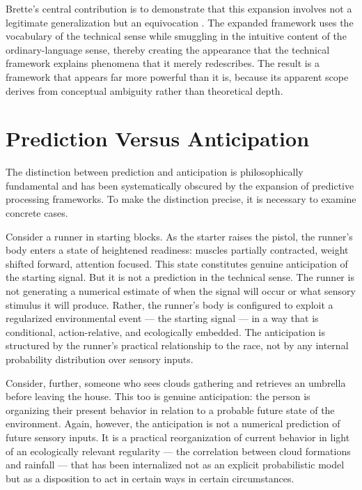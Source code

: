 \documentclass[12pt,a4paper]{report}
\theoremstyle{flyxion}
\begin{document}
Brette's central contribution is to demonstrate that this expansion involves not a legitimate generalization but an equivocation \cite{brettepredictive}. The expanded framework uses the vocabulary of the technical sense while smuggling in the intuitive content of the ordinary-language sense, thereby creating the appearance that the technical framework explains phenomena that it merely redescribes. The result is a framework that appears far more powerful than it is, because its apparent scope derives from conceptual ambiguity rather than theoretical depth.

\section{Prediction Versus Anticipation}

The distinction between prediction and anticipation is philosophically fundamental and has been systematically obscured by the expansion of predictive processing frameworks. To make the distinction precise, it is necessary to examine concrete cases.

Consider a runner in starting blocks. As the starter raises the pistol, the runner's body enters a state of heightened readiness: muscles partially contracted, weight shifted forward, attention focused. This state constitutes genuine anticipation of the starting signal. But it is not a prediction in the technical sense. The runner is not generating a numerical estimate of when the signal will occur or what sensory stimulus it will produce. Rather, the runner's body is configured to exploit a regularized environmental event --- the starting signal --- in a way that is conditional, action-relative, and ecologically embedded. The anticipation is structured by the runner's practical relationship to the race, not by any internal probability distribution over sensory inputs.

Consider, further, someone who sees clouds gathering and retrieves an umbrella before leaving the house. This too is genuine anticipation: the person is organizing their present behavior in relation to a probable future state of the environment. Again, however, the anticipation is not a numerical prediction of future sensory inputs. It is a practical reorganization of current behavior in light of an ecologically relevant regularity --- the correlation between cloud formations and rainfall --- that has been internalized not as an explicit probabilistic model but as a disposition to act in certain ways in certain circumstances.
\end{document}
